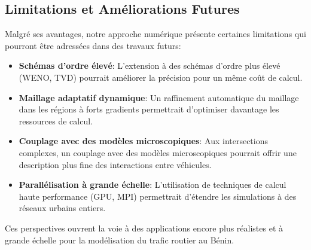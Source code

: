 \subsection{Limitations et Améliorations Futures}
\label{subsec:limitations}

Malgré ses avantages, notre approche numérique présente certaines limitations qui pourront être adressées dans des travaux futurs:

\begin{itemize}
\item \textbf{Schémas d'ordre élevé}: L'extension à des schémas d'ordre plus élevé (WENO, TVD) pourrait améliorer la précision pour un même coût de calcul.

\item \textbf{Maillage adaptatif dynamique}: Un raffinement automatique du maillage dans les régions à forts gradients permettrait d'optimiser davantage les ressources de calcul.

\item \textbf{Couplage avec des modèles microscopiques}: Aux intersections complexes, un couplage avec des modèles microscopiques pourrait offrir une description plus fine des interactions entre véhicules.

\item \textbf{Parallélisation à grande échelle}: L'utilisation de techniques de calcul haute performance (GPU, MPI) permettrait d'étendre les simulations à des réseaux urbains entiers.
\end{itemize}

Ces perspectives ouvrent la voie à des applications encore plus réalistes et à grande échelle pour la modélisation du trafic routier au Bénin.